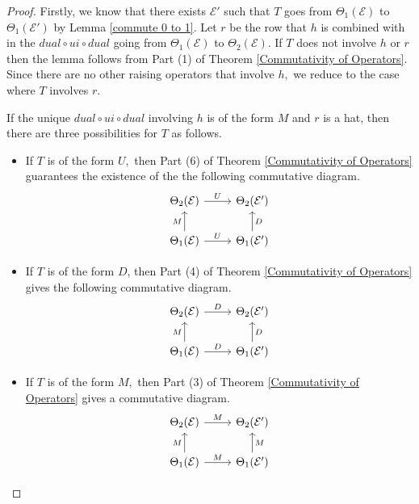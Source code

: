 \documentclass[11pt,letterpaper]{amsart}
\newcommand{\EE}{\mathcal{E}}
\numberwithin{equation}{section}
\begin{document}
\begin{proof}
    Firstly, we know that there exists $\EE'$ such that $T$ goes from $\Theta_1(\EE)$ to $\Theta_1(\EE')$ by Lemma \ref{commute 0 to 1}. Let $r$ be the row that $h$ is combined with in the $dual \circ ui \circ dual$ going from $\Theta_1(\EE)$ to $\Theta_2(\EE).$ If $T$ does not involve $h$ or $r$ then the lemma follows from Part (1) of Theorem \ref{Commutativity of Operators}. Since there are no other raising operators that involve $h,$ we reduce to the case where $T$ involves $r.$

    If the unique $dual \circ ui \circ dual$ involving $h$ is of the form $M$ and $r$ is a hat, then there are three possibilities for $T$ as follows.
    \begin{itemize}
        \item If $T$ is of the form $U,$ then Part (6) of Theorem \ref{Commutativity of Operators} guarantees the existence of the the following commutative diagram.
        \[\begin{tikzcd}
	{\Theta_2(\EE)} & {\Theta_2(\EE')} \\
	{\Theta_1(\EE)} & {\Theta_1(\EE')}
	\arrow["U", from=1-1, to=1-2]
	\arrow["M", from=2-1, to=1-1]
	\arrow["U", from=2-1, to=2-2]
	\arrow["D"', from=2-2, to=1-2]
\end{tikzcd}\]

        \item If $T$ is of the form $D$, then Part (4) of Theorem \ref{Commutativity of Operators} gives the following commutative diagram.
        \[\begin{tikzcd}
	{\Theta_2(\EE)} & {\Theta_2(\EE')} \\
	{\Theta_1(\EE)} & {\Theta_1(\EE')}
	\arrow["D", from=1-1, to=1-2]
	\arrow["M", from=2-1, to=1-1]
	\arrow["D", from=2-1, to=2-2]
	\arrow["D"', from=2-2, to=1-2]
\end{tikzcd}\]

        \item If $T$ is of the form $M,$ then Part (3) of Theorem \ref{Commutativity of Operators} gives a commutative diagram.
        \[\begin{tikzcd}
	{\Theta_2(\EE)} & {\Theta_2(\EE')} \\
	{\Theta_1(\EE)} & {\Theta_1(\EE')}
	\arrow["M", from=1-1, to=1-2]
	\arrow["M", from=2-1, to=1-1]
	\arrow["M", from=2-1, to=2-2]
	\arrow["M"', from=2-2, to=1-2]
\end{tikzcd}\]
    \end{itemize}


\end{proof}
\end{document}
